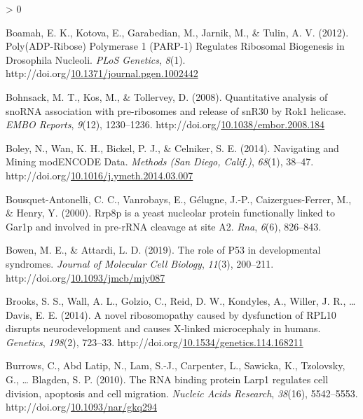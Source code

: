 \documentclass[12pt,oneside]{reedthesis}
\newlength{\cslhangindent}
\newenvironment{CSLReferences}[2] %
 {%
  \setlength{\parindent}{0pt}
  \ifodd #1 \everypar{\setlength{\hangindent}{\cslhangindent}}\ignorespaces\fi
  \ifnum #2 > 0
  \setlength{\parskip}{#2\baselineskip}
  \fi
 }%
 {}
\begin{document}
\begin{CSLReferences}{1}{0}
\leavevmode\hypertarget{ref-boamahPolyADPRibosePolymerase2012}{}%
Boamah, E. K., Kotova, E., Garabedian, M., Jarnik, M., \& Tulin, A. V. (2012). Poly({ADP-Ribose}) {Polymerase} 1 ({PARP-1}) {Regulates Ribosomal Biogenesis} in {Drosophila Nucleoli}. \emph{PLoS Genetics}, \emph{8}(1). http://doi.org/\href{https://doi.org/10.1371/journal.pgen.1002442}{10.1371/journal.pgen.1002442}

\leavevmode\hypertarget{ref-bohnsackQuantitativeAnalysisSnoRNA2008}{}%
Bohnsack, M. T., Kos, M., \& Tollervey, D. (2008). Quantitative analysis of {snoRNA} association with pre-ribosomes and release of {snR30} by {Rok1} helicase. \emph{EMBO Reports}, \emph{9}(12), 1230--1236. http://doi.org/\href{https://doi.org/10.1038/embor.2008.184}{10.1038/embor.2008.184}

\leavevmode\hypertarget{ref-boleyNavigatingMiningModENCODE2014}{}%
Boley, N., Wan, K. H., Bickel, P. J., \& Celniker, S. E. (2014). Navigating and {Mining modENCODE Data}. \emph{Methods (San Diego, Calif.)}, \emph{68}(1), 38--47. http://doi.org/\href{https://doi.org/10.1016/j.ymeth.2014.03.007}{10.1016/j.ymeth.2014.03.007}

\leavevmode\hypertarget{ref-Bousquet-Antonelli2000a}{}%
Bousquet-Antonelli, C. C., Vanrobays, E., Gélugne, J.-P., Caizergues-Ferrer, M., \& Henry, Y. (2000). Rrp8p is a yeast nucleolar protein functionally linked to {Gar1p} and involved in pre-{rRNA} cleavage at site {A2}. \emph{Rna}, \emph{6}(6), 826--843.

\leavevmode\hypertarget{ref-bowenRoleP53Developmental2019}{}%
Bowen, M. E., \& Attardi, L. D. (2019). The role of P53 in developmental syndromes. \emph{Journal of Molecular Cell Biology}, \emph{11}(3), 200--211. http://doi.org/\href{https://doi.org/10.1093/jmcb/mjy087}{10.1093/jmcb/mjy087}

\leavevmode\hypertarget{ref-Brooks2014b}{}%
Brooks, S. S., Wall, A. L., Golzio, C., Reid, D. W., Kondyles, A., Willer, J. R., \ldots{} Davis, E. E. (2014). A novel ribosomopathy caused by dysfunction of {RPL10} disrupts neurodevelopment and causes {X-linked} microcephaly in humans. \emph{Genetics}, \emph{198}(2), 723--33. http://doi.org/\href{https://doi.org/10.1534/genetics.114.168211}{10.1534/genetics.114.168211}

\leavevmode\hypertarget{ref-burrowsRNABindingProtein2010}{}%
Burrows, C., Abd Latip, N., Lam, S.-J., Carpenter, L., Sawicka, K., Tzolovsky, G., \ldots{} Blagden, S. P. (2010). The {RNA} binding protein {Larp1} regulates cell division, apoptosis and cell migration. \emph{Nucleic Acids Research}, \emph{38}(16), 5542--5553. http://doi.org/\href{https://doi.org/10.1093/nar/gkq294}{10.1093/nar/gkq294}


\end{CSLReferences}
\end{document}
